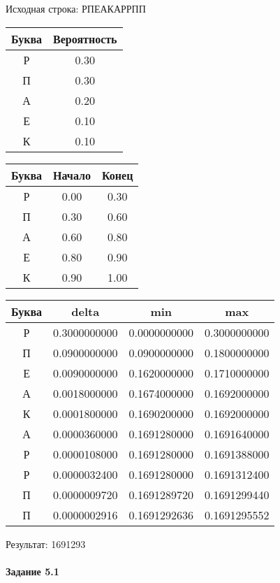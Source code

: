 \documentclass[a4paper, 12pt]{article}
\begin{document}
Исходная строка: РПЕАКАРРПП\
\begin{center}
 \begin{tabular}{ |c|c| } 
  \hline
     Буква & Вероятность \\ \hline
Р & 0.30\\\hline
П & 0.30\\\hline
А & 0.20\\\hline
Е & 0.10\\\hline
К & 0.10
\\ \hline \end{tabular}
\end{center}
\begin{center}
 \begin{tabular}{ |c|c|c| } 
  \hline
     Буква & Начало & Конец \\ \hline
Р & 0.00 & 0.30\\\hline
П & 0.30 & 0.60\\\hline
А & 0.60 & 0.80\\\hline
Е & 0.80 & 0.90\\\hline
К & 0.90 & 1.00
\\ \hline \end{tabular}
\end{center}
\begin{center}
 \begin{tabular}{ |c|c|c|c| } 
  \hline
     Буква & delta & min & max \\ \hline
Р & 0.3000000000 & 0.0000000000 & 0.3000000000\\\hline
П & 0.0900000000 & 0.0900000000 & 0.1800000000\\\hline
Е & 0.0090000000 & 0.1620000000 & 0.1710000000\\\hline
А & 0.0018000000 & 0.1674000000 & 0.1692000000\\\hline
К & 0.0001800000 & 0.1690200000 & 0.1692000000\\\hline
А & 0.0000360000 & 0.1691280000 & 0.1691640000\\\hline
Р & 0.0000108000 & 0.1691280000 & 0.1691388000\\\hline
Р & 0.0000032400 & 0.1691280000 & 0.1691312400\\\hline
П & 0.0000009720 & 0.1691289720 & 0.1691299440\\\hline
П & 0.0000002916 & 0.1691292636 & 0.1691295552
\\ \hline \end{tabular}
\end{center}
Результат: 1691293
\pagebreak
\paragraph{Задание 5.1 \\
}
\end{document}
